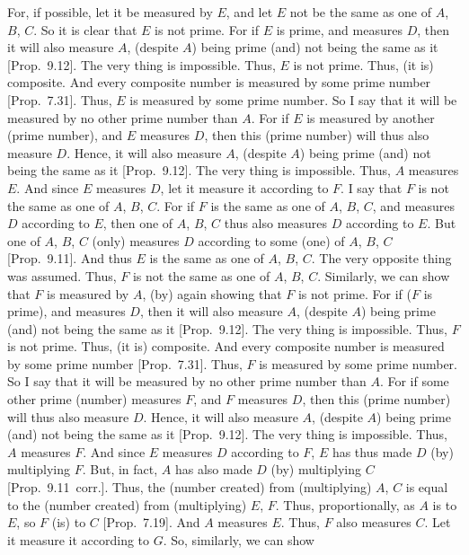 \begin{Parallel}{}{}
{For, if possible, let it be measured by $E$, and let $E$ not be
the same as one of $A$, $B$, $C$. So it is clear that $E$ is not prime. 
For if $E$ is prime, and measures $D$, then it will also measure $A$, (despite $A$) being prime (and) not being  the same as it [Prop.~9.12]. The very thing is impossible. Thus, $E$
is not prime. Thus, (it is) composite. And every composite
number is measured by some prime number [Prop.~7.31]. Thus, $E$ is measured by some prime number. So I say that it will be measured by no other prime number than $A$.
For if $E$ is measured by another (prime number), and $E$ measures $D$, then this (prime number) will thus also measure $D$. Hence, it will also
measure $A$,  (despite $A$) being prime (and) not being  the same as it [Prop.~9.12]. The very thing is impossible. Thus,
$A$ measures $E$. And since $E$ measures $D$, let it measure it according to $F$. I say that $F$ is not the same as one of $A$, $B$, $C$. For if $F$ is
the same as one of $A$, $B$, $C$, and measures $D$ according to $E$,
then one of $A$, $B$, $C$ thus also measures $D$ according to $E$.
But one of $A$, $B$, $C$ (only) measures $D$ according to some (one) of
$A$, $B$, $C$
[Prop.~9.11]. And thus $E$ is the same as one of
$A$, $B$, $C$. The very opposite thing was assumed. Thus, $F$ is not the
same as one of $A$, $B$, $C$. Similarly, we can show that $F$ is measured by $A$,  (by) again showing that $F$ is not prime. For if ($F$ is prime), and measures $D$,  then it will also measure $A$, (despite $A$) being prime (and) not being  the same as it [Prop.~9.12]. The very thing
is impossible. Thus, $F$ is not prime. Thus, (it is) composite.  And every composite
number is measured by some prime number [Prop.~7.31]. Thus, $F$ is measured by some prime
number. So I say that it will be measured by no other prime number than $A$.
For if  some other prime (number) measures $F$, and $F$ measures $D$, then this (prime number) will thus also measure $D$.  Hence, it will also
measure $A$,  (despite $A$) being prime (and) not being  the same as it [Prop.~9.12]. The very thing is impossible.
Thus, $A$ measures $F$. And since $E$ measures $D$ according to 
$F$, $E$ has thus made $D$ (by) multiplying $F$.  But, in fact, $A$ has
also made $D$ (by) multiplying $C$ [Prop.~9.11~corr.]. Thus, the (number created) from (multiplying)
$A$, $C$ is equal to  the (number created) from (multiplying) $E$, $F$. Thus, proportionally, as $A$ is to $E$, so $F$ (is) to $C$ [Prop.~7.19]. And $A$ measures $E$. Thus, $F$ also
measures $C$. Let it
 measure it according to $G$. So, similarly, we can show
}
\end{Parallel}
